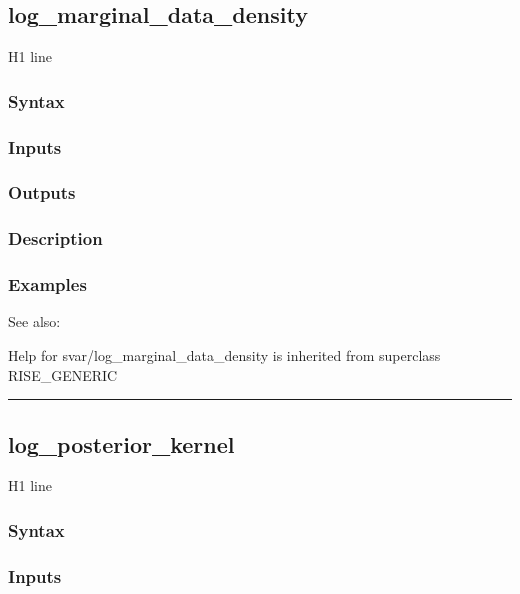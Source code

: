 \documentclass[letterpaper,10pt,english]{sphinxmanual}
\begin{document}
\subsection{log\_marginal\_data\_density}
\label{classes/models/@svar/svar:log-marginal-data-density}\label{classes/models/@svar/svar:id48}
H1 line


\subsubsection{Syntax}
\label{classes/models/@svar/svar:id49}

\subsubsection{Inputs}
\label{classes/models/@svar/svar:id50}

\subsubsection{Outputs}
\label{classes/models/@svar/svar:id51}

\subsubsection{Description}
\label{classes/models/@svar/svar:id52}

\subsubsection{Examples}
\label{classes/models/@svar/svar:id53}
See also:

Help for svar/log\_marginal\_data\_density is inherited from superclass RISE\_GENERIC


\bigskip\hrule{}\bigskip



\subsection{log\_posterior\_kernel}
\label{classes/models/@svar/svar:log-posterior-kernel}\label{classes/models/@svar/svar:id54}
H1 line


\subsubsection{Syntax}
\label{classes/models/@svar/svar:id55}

\subsubsection{Inputs}
\label{classes/models/@svar/svar:id56}
\end{document}
